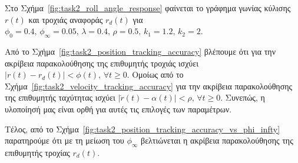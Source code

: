 \documentclass[a4paper,12pt]{article}
\begin{document}
Στο Σχήμα~\ref{fig:task2_roll_angle_response} φαίνεται το γράφημα γωνίας κύλισης $r(t)$ και τροχιάς αναφοράς
$r_d(t)$ για $\phi_0 = 0.4, \, \phi_{\infty} = 0.05, \, \lambda = 0.4, \, \rho = 0.5, \, k_1 = 1.2, \,
k_2 = 2$.

Από το Σχήμα~\ref{fig:task2_position_tracking_accuracy} βλέπουμε ότι για την ακρίβεια παρακολούθησης
της επιθυμητής τροχιάς ισχύει $|r(t) - r_d(t)| < \phi(t), \, \forall t \geq 0$. Ομοίως από το 
Σχήμα~\ref{fig:task2_velocity_tracking_accuracy} για την ακρίβεια παρακολούθησης της επιθυμητής ταχύτητας 
ισχύει $|\dot{r}(t) - \alpha(t)| < \rho, \, \forall t \geq 0$. Συνεπώς, η υλοποίησή μας είναι ορθή για αυτές
τις επιλογές των παραμέτρων.

Τέλος, από το Σχήμα~\ref{fig:task2_position_tracking_accuracy_vs_phi_infty} παρατηρούμε ότι με τη μείωση του 
$\phi_{\infty}$ βελτιώνεται η ακρίβεια παρακολούθησης της επιθυμητής τροχίας $r_d(t)$.
\end{document}

